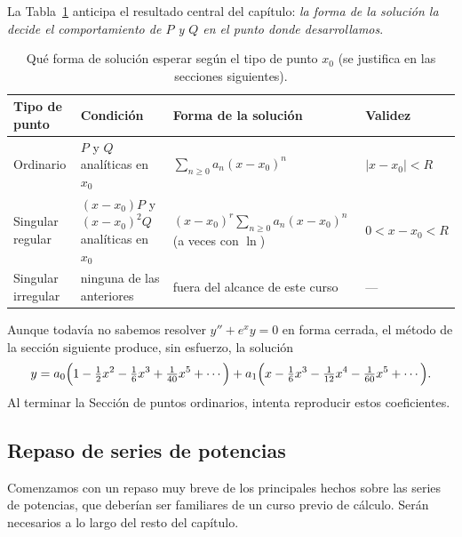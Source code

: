 La Tabla~\ref{tab:s1-formas} anticipa el resultado central del capítulo: \emph{la forma de la solución la decide el comportamiento de $P$ y $Q$ en el punto donde desarrollamos}.
 
\begin{table}[H]
\centering
\small
\caption{Qué forma de solución esperar según el tipo de punto $x_0$ (se justifica en las secciones siguientes).}
\label{tab:s1-formas}
\begin{tabular}{|p{2.9cm}|p{4.4cm}|p{4.2cm}|p{3.2cm}|}
\hline
\rowcolor{bbe!15}\textbf{Tipo de punto} & \textbf{Condición} & \textbf{Forma de la solución} & \textbf{Validez} \\ \hline
Ordinario & $P$ y $Q$ analíticas en $x_0$ & $\displaystyle\sum_{n\ge 0} a_n(x-x_0)^n$ & $|x-x_0|<R$ \\ \hline
Singular regular & $(x-x_0)P$ y $(x-x_0)^2Q$ analíticas en $x_0$ & $(x-x_0)^r\displaystyle\sum_{n\ge 0} a_n(x-x_0)^n$ (a veces con $\ln$) & $0<x-x_0<R$ \\ \hline
Singular irregular & ninguna de las anteriores & fuera del alcance de este curso & --- \\ \hline
\end{tabular}
\end{table}
 
\begin{remark}
Aunque todavía no sabemos resolver $y''+e^xy=0$ en forma cerrada, el método de la sección siguiente produce, sin esfuerzo, la solución
\[
y = a_0\Bigl(1-\tfrac{1}{2}x^2-\tfrac{1}{6}x^3+\tfrac{1}{40}x^5+\cdots\Bigr)
 + a_1\Bigl(x-\tfrac{1}{6}x^3-\tfrac{1}{12}x^4-\tfrac{1}{60}x^5+\cdots\Bigr).
\]
Al terminar la Sección de puntos ordinarios, intenta reproducir estos coeficientes.
\end{remark}
 
\subsection{Repaso de series de potencias}
 Comenzamos con un repaso muy breve de los principales hechos sobre las series de potencias, que deberían ser familiares de un curso previo de cálculo. Serán necesarios a lo largo del resto del capítulo.
 
